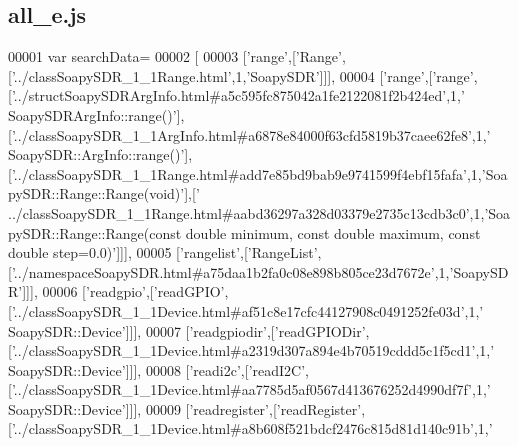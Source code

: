 \subsection{all\+\_\+e.\+js}
\label{all__e_8js_source}

\begin{DoxyCode}
00001 var searchData=
00002 [
00003   [\textcolor{stringliteral}{'range'},[\textcolor{stringliteral}{'Range'},[\textcolor{stringliteral}{'../classSoapySDR\_1\_1Range.html'},1,\textcolor{stringliteral}{'SoapySDR'}]]],
00004   [\textcolor{stringliteral}{'range'},[\textcolor{stringliteral}{'range'},[\textcolor{stringliteral}{'../structSoapySDRArgInfo.html#a5c595fc875042a1fe2122081f2b424ed'},1,\textcolor{stringliteral}{'
      SoapySDRArgInfo::range()'}],[\textcolor{stringliteral}{'../classSoapySDR\_1\_1ArgInfo.html#a6878e84000f63cfd5819b37caee62fe8'},1,\textcolor{stringliteral}{'
      SoapySDR::ArgInfo::range()'}],[\textcolor{stringliteral}{'../classSoapySDR\_1\_1Range.html#add7e85bd9bab9e9741599f4ebf15fafa'},1,\textcolor{stringliteral}{'SoapySDR::Range::Range(void)'}],[\textcolor{stringliteral}{'
      ../classSoapySDR\_1\_1Range.html#aabd36297a328d03379e2735c13cdb3c0'},1,\textcolor{stringliteral}{'SoapySDR::Range::Range(const double
       minimum, const double maximum, const double step=0.0)'}]]],
00005   [\textcolor{stringliteral}{'rangelist'},[\textcolor{stringliteral}{'RangeList'},[\textcolor{stringliteral}{'../namespaceSoapySDR.html#a75daa1b2fa0c08e898b805ce23d7672e'},1,\textcolor{stringliteral}{'SoapySDR'}]]],
00006   [\textcolor{stringliteral}{'readgpio'},[\textcolor{stringliteral}{'readGPIO'},[\textcolor{stringliteral}{'../classSoapySDR\_1\_1Device.html#af51c8e17cfc44127908c0491252fe03d'},1,\textcolor{stringliteral}{'
      SoapySDR::Device'}]]],
00007   [\textcolor{stringliteral}{'readgpiodir'},[\textcolor{stringliteral}{'readGPIODir'},[\textcolor{stringliteral}{'../classSoapySDR\_1\_1Device.html#a2319d307a894e4b70519cddd5c1f5cd1'},1,\textcolor{stringliteral}{'
      SoapySDR::Device'}]]],
00008   [\textcolor{stringliteral}{'readi2c'},[\textcolor{stringliteral}{'readI2C'},[\textcolor{stringliteral}{'../classSoapySDR\_1\_1Device.html#aa7785d5af0567d413676252d4990df7f'},1,\textcolor{stringliteral}{'
      SoapySDR::Device'}]]],
00009   [\textcolor{stringliteral}{'readregister'},[\textcolor{stringliteral}{'readRegister'},[\textcolor{stringliteral}{'../classSoapySDR\_1\_1Device.html#a8b608f521bdcf2476c815d81d140c91b'},1,\textcolor{stringliteral}{'
}
\end{DoxyCode}
